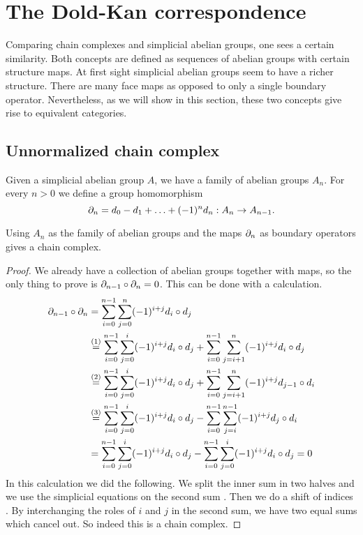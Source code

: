 \section{The Dold-Kan correspondence}
\label{sec:Constructions}

Comparing chain complexes and simplicial abelian groups, one sees a certain similarity. Both concepts are defined as sequences of abelian groups with certain structure maps. At first sight simplicial abelian groups seem to have a richer structure. There are many face maps as opposed to only a single boundary operator. Nevertheless, as we will show in this section, these two concepts give rise to equivalent categories.

\subsection{Unnormalized chain complex}
Given a simplicial abelian group $A$, we have a family of abelian groups $A_n$. For every $n>0$ we define a group homomorphism
$$\partial_n = d_0 - d_1 + \ldots + (-1)^n d_n: A_n \to A_{n-1}.$$
\begin{lemma}
	Using $A_n$ as the family of abelian groups and the maps $\partial_n$ as boundary operators gives a chain complex.
\end{lemma}
\begin{proof}
	We already have a collection of abelian groups together with maps, so the only thing to prove is $\partial_{n-1} \circ \partial_n = 0$. This can be done with a calculation.
	\begin{align*}
		\partial_{n-1} \circ \partial_n &= \sum_{i=0}^{n-1}  \sum_{j=0}^{n} (-1)^{i+j} d_i \circ d_j \\
			&\stackrel{(1)}{=} \sum_{i=0}^{n-1} \sum_{j=0}^{i} (-1)^{i+j} d_i \circ d_j + \sum_{i=0}^{n-1} \sum_{j=i+1}^{n} (-1)^{i+j} d_i \circ d_j \\
			&\stackrel{(2)}{=} \sum_{i=0}^{n-1} \sum_{j=0}^{i} (-1)^{i+j} d_i \circ d_j + \sum_{i=0}^{n-1} \sum_{j=i+1}^{n} (-1)^{i+j} d_{j-1} \circ d_i \\
			&\stackrel{(3)}{=} \sum_{i=0}^{n-1} \sum_{j=0}^{i} (-1)^{i+j} d_i \circ d_j - \sum_{i=0}^{n-1} \sum_{j=i}^{n-1} (-1)^{i+j} d_j \circ d_i \\
			&= \sum_{i=0}^{n-1} \sum_{j=0}^{i} (-1)^{i+j} d_i \circ d_j - \sum_{i=0}^{n-1} \sum_{j=0}^{i} (-1)^{i+j} d_i \circ d_j = 0
	\end{align*}
	In this calculation we did the following. We split the inner sum in two halves  and we use the simplicial equations on the second sum . Then we do a shift of indices . By interchanging the roles of $i$ and $j$ in the second sum, we have two equal sums which cancel out. So indeed this is a chain complex.
\end{proof}

